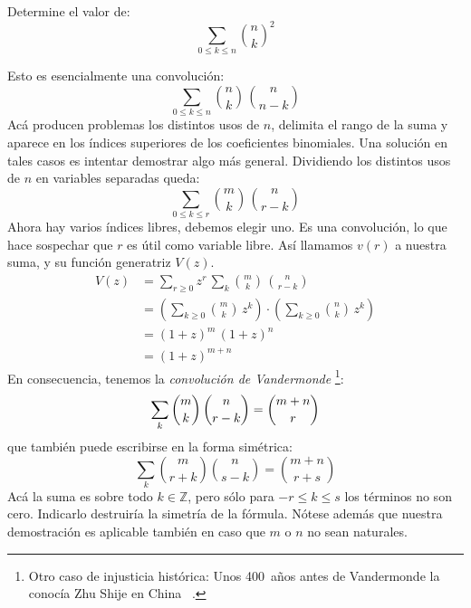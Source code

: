   \begin{example}
    Determine el valor de:
    \begin{equation*}
      \sum_{0 \le k \le n} \binom{n}{k}^2
    \end{equation*}

    Esto es esencialmente una convolución:
    \begin{equation*}
      \sum_{0 \le k \le n} \binom{n}{k} \, \binom{n}{n - k}
    \end{equation*}
    Acá producen problemas los distintos usos de \(n\),
    delimita el rango de la suma
    y aparece en los índices superiores
    de los coeficientes binomiales.
    Una solución en tales casos
    es intentar demostrar algo más general.
    Dividiendo los distintos usos de \(n\) en variables separadas
    queda:
    \begin{equation*}
      \sum_{0 \le k \le r} \binom{m}{k} \, \binom{n}{r - k}
    \end{equation*}
    Ahora hay varios índices libres,
    debemos elegir uno.
    Es una convolución,
    lo que hace sospechar que \(r\) es útil como variable libre.
    Así llamamos \(v(r)\) a nuestra suma,
    y su función generatriz \(V(z)\).
    \begin{align*}
      V(z)
	&= \sum_{r \ge 0}
	     z^r \, \sum_k \binom{m}{k} \, \binom{n}{r - k} \\
	&= \left( \sum_{k \ge 0} \binom{m}{k} \, z^k \right)
	     \cdot \left(
		     \sum_{k \ge 0} \binom{n}{k} \, z^k
		   \right) \\
	&= (1 + z)^m \, (1 + z)^n \\
	&= (1 + z)^{m + n}
    \end{align*}
    En consecuencia,
    tenemos la \emph{convolución de Vandermonde}%
      \footnote{Otro caso de injusticia histórica:
		Unos 400~años antes de Vandermonde
		la conocía Zhu Shije en China~%
		   \cite[páginas 59--60]
			{askey75:_orthogonal_poly_special_functions}.}:
    \begin{equation}
      \label{eq:Vandermonde-convolution}
      \index{Vandermonde, convolucion de@Vandermonde, convolución de}
      \sum_k \binom{m}{k} \, \binom{n}{r - k}
	= \binom{m + n}{r}
    \end{equation}
    que también puede escribirse en la forma simétrica:
    \begin{equation}
      \label{eq:Vandermonde-convolution-symmetric}
      \sum_k \binom{m}{r + k} \binom{n}{s - k}
	= \binom{m + n}{r + s}
    \end{equation}
    Acá la suma es sobre todo \(k \in \mathbb{Z}\),
    pero sólo para \(-r \le k \le s\) los términos no son cero.
    Indicarlo destruiría la simetría de la fórmula.
    Nótese además que nuestra demostración es aplicable
    también en caso que \(m\) o \(n\) no sean naturales.


\end{example}

